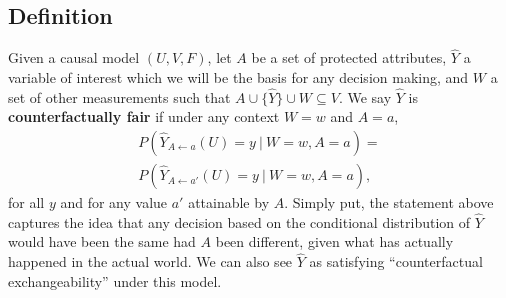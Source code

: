 \begin{figure}[th!]
\end{figure}


\subsection{Definition}
Given a causal model $(U, V, F)$, let $A$ be a set of protected
attributes, $\hat Y$ a variable of interest which we will be the basis for
any decision making, and $W$ a set of other measurements such that $A
\cup \{\hat Y\} \cup W \subseteq V$. We say $\hat Y$ is {\bf
  counterfactually fair} if under any context $W = w$ and $A = a$,
\begin{equation}
  \label{eq:cf_definition}
\begin{array}{c}
  P(\hat Y_{A \leftarrow a}(U) = y\ |\ W = w, A = a)  =\\ 
  P(\hat Y_{A \leftarrow a'}(U) = y\ |\ W = w, A = a), 
\end{array}
\end{equation}
\noindent for all $y$ and for any value $a'$ attainable by $A$. Simply put,
the statement above captures the idea that any decision based on the
conditional distribution of $\hat Y$ would have been the same had $A$ been
different, given what has actually happened in the actual world.
We can also see $\hat Y$ as satisfying ``counterfactual exchangeability''
under this model.

